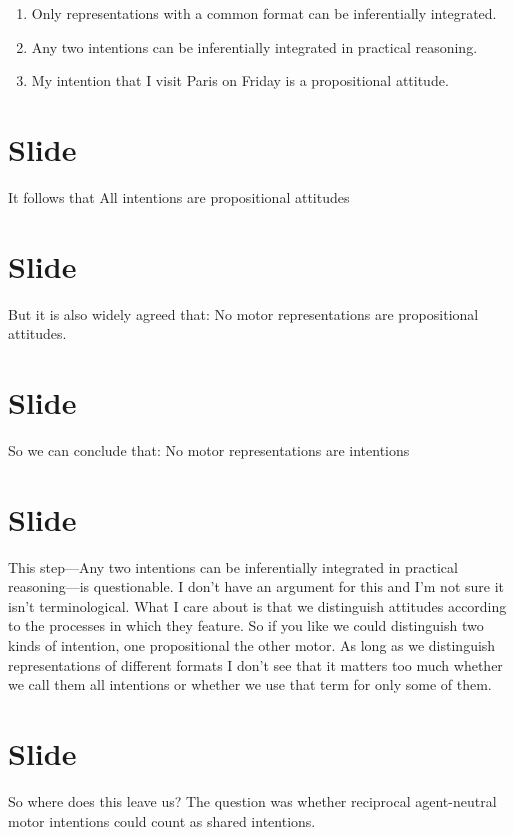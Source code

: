 \documentclass[12pt,\papersize]{extarticle}
\begin{document}
\begin{enumerate}
\item Only representations with a common format can be inferentially integrated.

\item Any two intentions can be inferentially integrated in practical reasoning.

\item My intention that I visit Paris on Friday is a propositional attitude.
\end{enumerate}


\section{Slide}
It follows that 
All intentions are propositional attitudes



\section{Slide}
But it is also widely agreed that:
No motor representations are propositional attitudes.



\section{Slide}
So we can conclude that:
 No motor representations are intentions



\section{Slide}
This step---Any two intentions can be inferentially integrated in practical reasoning---is questionable.  I don’t have an argument for this and I’m not sure it isn’t terminological.  
What I care about is that we distinguish attitudes according to the processes in which they feature.
So if you like we could distinguish two kinds of intention, one propositional the other motor.
As long as we distinguish representations of different formats I don’t see that it matters too much whether we call them all intentions or whether we use that term for only some of them.




\section{Slide}
So where does this leave us?
The question was whether reciprocal agent-neutral motor intentions could count as shared intentions.
\end{document}
